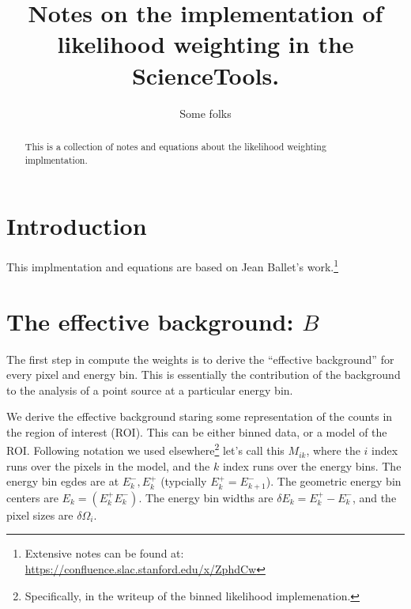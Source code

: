 \documentclass[preprint]{aastex}
\begin{document}
%
\title{Notes on the implementation of likelihood weighting in the ScienceTools.}  

\author{ 
Some folks
}



\begin{abstract}
  This is a collection of notes and equations about the likelihood weighting implmentation.
\end{abstract}

\maketitle

\section{Introduction}

This implmentation and equations are based on Jean Ballet's work.\footnote{Extensive notes can be found at: \url{https://confluence.slac.stanford.edu/x/ZphdCw}}


\section{The effective background: $B$}

The first step in compute the weights is to derive the ``effective
background'' for every pixel and energy bin.  This is essentially the
contribution of the background to the analysis of a point source at a
particular energy bin.

We derive the effective background staring some representation of the
counts in the region of interest (ROI).  This can be either binned
data, or a model of the ROI.  Following notation we used
elsewhere\footnote{Specifically, in the writeup of the binned
  likelihood implemenation.} let's call this $M_{ik}$, where the $i$
index runs over the pixels in the model, and the $k$ index runs over
the energy bins.  The energy bin egdes are at $E_k^-, E_k^+$
(typcially $E_k^+ = E_{k+1}^-$).  The geometric energy bin centers are
$E_k = (E_k^+ E_k^-)$.  The energy bin widths are $\delta E_k = E_k^+
- E_k^-$, and the pixel sizes are $\delta \Omega_i$.
\end{document}
